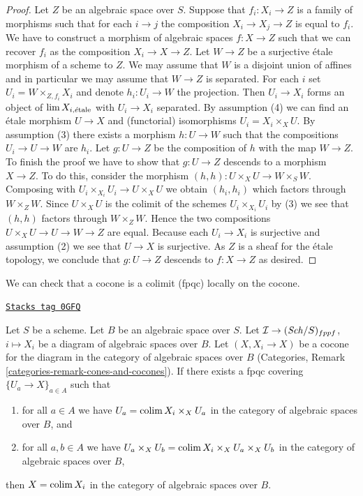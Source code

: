 \begin{proof}
Let $Z$ be an algebraic space over $S$. Suppose that $f_i : X_i \to Z$ is
a family of morphisms such that for each $i \to j$ the composition
$X_i \to X_j \to Z$ is equal to $f_i$. We have to construct a morphism
of algebraic spaces $f : X \to Z$ such that we can recover $f_i$ as
the composition $X_i \to X \to Z$. Let $W \to Z$ be a surjective
\'etale morphism of a scheme to $Z$. We may assume that $W$ is a
disjoint union of affines and in particular we may assume that
$W \to Z$ is separated. For each $i$ set
$U_i = W \times_{Z, f_i} X_i$ and denote $h_i : U_i \to W$ the projection.
Then $U_i \to X_i$ forms an object of $\lim X_{i, \acute{e}\text{tale}}$
with $U_i \to X_i$ separated. By
assumption (4) we can find an \'etale morphism $U \to X$ and (functorial)
isomorphisms $U_i = X_i \times_X U$. By assumption (3) there exists a morphism
$h : U \to W$ such that the compositions $U_i \to U \to W$ are $h_i$.
Let $g : U \to Z$ be the composition of $h$ with the map $W \to Z$. To
finish the proof we have to show that $g : U \to Z$ descends to a morphism
$X \to Z$. To do this, consider the morphism
$(h, h) : U \times_X U \to W \times_S W$.
Composing with $U_i \times_{X_i} U_i \to U \times_X U$ we obtain
$(h_i, h_i)$ which factors through $W \times_Z W$. Since $U \times_X U$
is the colimit of the schemes $U_i \times_{X_i} U_i$ by (3) we see
that $(h, h)$ factors through $W \times_Z W$. Hence the two compositions
$U \times_X U \to U \to W \to Z$ are equal. Because each $U_i \to X_i$ is
surjective and assumption (2) we see that $U \to X$ is surjective.
As $Z$ is a sheaf for the \'etale topology, we conclude that
$g : U \to Z$ descends to $f : X \to Z$ as desired.
\end{proof}

We can check that a cocone is a colimit (fpqc) locally on the cocone.

\begin{lemma}
\label{spaces-pushouts-lemma-pushout-fpqc-local}
\href{https://stacks.math.columbia.edu/tag/0GFQ}{\texttt{Stacks tag 0GFQ}}

Let $S$ be a scheme. Let $B$ be an algebraic space over $S$.
Let $\mathcal{I} \to (\mathit{Sch}/S)_{fppf}$, $i \mapsto X_i$
be a diagram of algebraic spaces over $B$. Let $(X, X_i \to X)$
be a cocone for the diagram in the category of algebraic spaces over $B$
(Categories, Remark \ref{categories-remark-cones-and-cocones}).
If there exists a fpqc covering $\{U_a \to X\}_{a \in A}$ such that
\begin{enumerate}
\item for all $a \in A$ we have
$U_a = \operatorname{colim} X_i \times_X U_a$
in the category of algebraic spaces over $B$, and
\item for all $a, b \in A$ we have
$U_a \times_X U_b = \operatorname{colim} X_i \times_X U_a \times_X U_b$
in the category of algebraic spaces over $B$,
\end{enumerate}
then $X = \operatorname{colim} X_i$ in the category of algebraic spaces over $B$.
\end{lemma}

